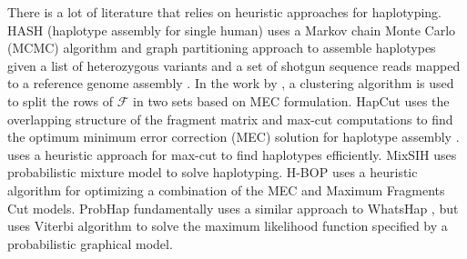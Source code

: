 There is a lot of literature that relies on heuristic approaches for haplotyping.
HASH (haplotype assembly for single human) uses a Markov chain Monte Carlo (MCMC) algorithm and graph partitioning approach to assemble haplotypes 
given a list of heterozygous variants and a set of shotgun sequence reads mapped to a reference genome assembly \citep{bansal2008mcmc}. 
In the work by \cite{wang2007clustering}, a clustering algorithm is used to split the rows of $\mathcal{F}$ in two sets based on MEC formulation.
HapCut uses the overlapping structure of the fragment matrix and max-cut computations to find the optimum minimum error correction (MEC) solution for haplotype assembly \citep{Bansal2008}. 
\cite{Duitama2010} uses a heuristic approach for max-cut to find haplotypes efficiently. 
MixSIH \citep{matsumoto2013mixsih} uses probabilistic mixture model to solve haplotyping.
H-BOP \citep{xie2012fast} uses a heuristic algorithm for optimizing a combination of the MEC and Maximum Fragments Cut models.
ProbHap \citep{Kuleshov2014b} fundamentally uses a similar approach to WhatsHap \citep{Patterson2015}, but uses Viterbi algorithm to solve the maximum likelihood function specified by a probabilistic graphical model. 
